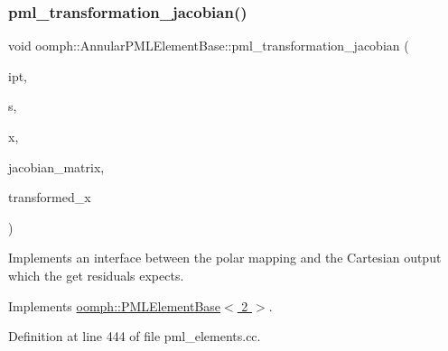 \subsubsection{\texorpdfstring{pml\+\_\+transformation\+\_\+jacobian()}{pml\_transformation\_jacobian()}\hspace{0.1cm}{\footnotesize\ttfamily [2/2]}}
{\footnotesize\ttfamily void oomph\+::\+Annular\+P\+M\+L\+Element\+Base\+::pml\+\_\+transformation\+\_\+jacobian (\begin{DoxyParamCaption}\item[{const unsigned \&}]{ipt,  }\item[{const \hyperlink{classoomph_1_1Vector}{Vector}$<$ double $>$ \&}]{s,  }\item[{const \hyperlink{classoomph_1_1Vector}{Vector}$<$ double $>$ \&}]{x,  }\item[{\hyperlink{classoomph_1_1DenseComplexMatrix}{Dense\+Complex\+Matrix} \&}]{jacobian\+\_\+matrix,  }\item[{\hyperlink{classoomph_1_1Vector}{Vector}$<$ std\+::complex$<$ double $>$ $>$ \&}]{transformed\+\_\+x }\end{DoxyParamCaption})\hspace{0.3cm}{\ttfamily [pure virtual]}}



Implements an interface between the polar mapping and the Cartesian output which the get residuals expects. 



Implements \hyperlink{classoomph_1_1PMLElementBase_a4b9d6d74aa15e6395590b27686477b20}{oomph\+::\+P\+M\+L\+Element\+Base$<$ 2 $>$}.



Definition at line 444 of file pml\+\_\+elements.\+cc.

\mbox{\label{classoomph_1_1AnnularPMLElementBase_a5e8b3cd8afddc6405af4d686afb578be}} 
